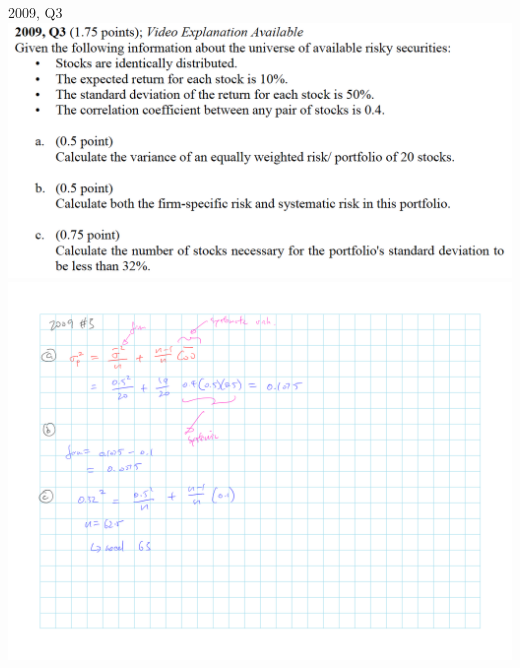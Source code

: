 \documentclass[]{book}
\theoremstyle{definition}
\theoremstyle{definition}
\theoremstyle{remark}
\begin{document}
 2009, Q3 \includegraphics{questions/2009-3Q.png}
\includegraphics{questions/2009-3A.png}
\end{document}
